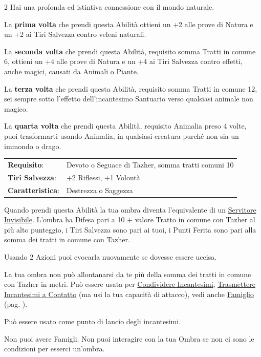 \begin{multicols}{2}
Hai una profonda ed istintiva connessione con il mondo naturale.

La \textbf{prima volta} che prendi questa Abilità ottieni un +2 alle prove di Natura e un +2 ai Tiri Salvezza contro veleni naturali.

La \textbf{seconda volta} che prendi questa Abilità, requisito somma Tratti in comune 6, ottieni un +4 alle prove di Natura e un +4 ai Tiri Salvezza contro effetti, anche magici, causati da Animali o Piante.

La \textbf{terza volta} che prendi questa Abilità, requisito somma Tratti in comune 12, sei sempre sotto l'effetto dell'incantesimo Santuario verso qualsiasi animale non magico.

La \textbf{quarta volta} che prendi questa Abilità, requisito Animalia preso 4 volte, puoi trasformarti usando Animalia, in qualsiasi creatura purché non sia un immondo o drago.

\hspace{-0.2cm}\begin{tabularx}{\linewidth}{l@{\hspace{8pt}}X}
\rowcolor{gray!20}\textbf{Requisito}: & Devoto o Seguace di Tazher, somma tratti comuni 10\\
\textbf{Tiri Salvezza}: & +2 Riflessi, +1 Volontà\\
\rowcolor{gray!20}\textbf{Caratteristica}: & Destrezza o Saggezza\\
\end{tabularx}\smallskip

Quando prendi questa Abilità la tua ombra diventa l'equivalente di un \hyperlink{Servitore Invisibile}{Servitore Invisibile}.
L'ombra ha Difesa pari a 10 + valore Tratto in comune con Tazher al più alto punteggio, i Tiri Salvezza sono pari ai tuoi, i Punti Ferita sono pari alla somma dei tratti in comune con Tazher.

Usando 2 Azioni puoi evocarla nuovamente se dovesse essere uccisa.

La tua ombra non può allontanarsi da te più della somma dei tratti in comune con Tazher in metri. Può essere usata per \hyperlink{Condividere Incantesimi}{Condividere Incantesimi}, \hyperlink{Trasmettere Incantesimi a Contatto}{Trasmettere Incantesimi a Contatto} (ma usi la tua capacità di attacco), vedi anche \hyperlink{famiglio}{Famiglio} (pag. \pageref{famiglio}).

Può essere usato come punto di lancio degli incantesimi.

Non puoi avere Famigli. Non puoi interagire con la tua Ombra se non ci sono le condizioni per esserci un'ombra.


\end{multicols}
